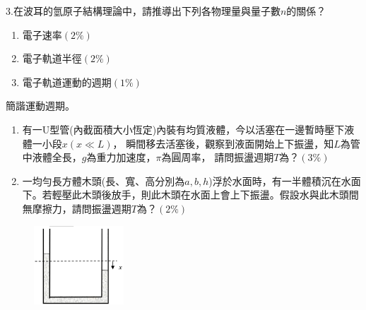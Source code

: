 \documentclass[cn,10pt,math=newtx,chinesefont=founder,device=ig]{elegantbook}
\begin{document}
\newpage



\begin{example}
   3.在波耳的氫原子結構理論中，請推導出下列各物理量與量子數$n$的關係？
   \begin{enumerate}[label=(\arabic*)]
     \item 電子速率$( 2\%)$
     \item 電子軌道半徑$( 2\%)$
     \item 電子軌道運動的週期$( 1\%)$
      \end{enumerate}

    \rightline{[成德高中教甄109]}
\end{example}
\begin{solution}
    
\end{solution}

\newpage


\begin{example}
    簡諧運動週期。
    \begin{enumerate}[label=(\arabic*)]
        \item 有一U型管(內截面積大小恆定)內裝有均質液體，今以活塞在一邊暫時壓下液體一小段$x(x\ll L)$，
        瞬間移去活塞後，觀察到液面開始上下振盪，知$L$為管中液體全長，$g$為重力加速度，$\pi$為圓周率，
        請問振盪週期$T$為？$( 3\% )$
        \item 一均勻長方體木頭(長、寬、高分別為$a, b, h$)浮於水面時，有一半體積沉在水面下。若輕壓此木頭後放手，則此木頭在水面上會上下振盪。假設水與此木頭間無摩擦力，請問振盪週期$T$為？$( 2\%)$
    \end{enumerate}
    
    \rightline{[成德高中教甄109]}
\end{example}
\begin{solution}

\end{solution}
\begin{figure}[htbp]
    \flushright
    \includegraphics[width=0.3\textwidth]{image/109成德44.png}
  \end{figure}
\newpage
\end{document}

